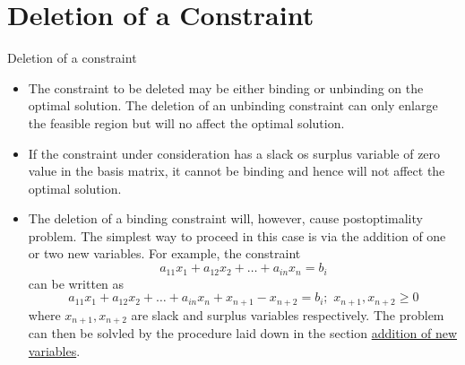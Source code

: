 
\section{Deletion of a Constraint}
\label{sec:deletion-constraint}

\begin{frame}{Deletion of a constraint}{}
  \begin{itemize} \justifying \parskip3mm
\item<only@1> The constraint to be deleted may be either binding or unbinding on the optimal solution. The deletion of an unbinding constraint can only enlarge the feasible region but will no affect the optimal solution.
\item<only@1> If the constraint under consideration has a slack os surplus variable of zero value in the basis matrix, it cannot be binding and hence will not affect the optimal solution.
\item<only@2> The deletion of a binding constraint will, however, cause postoptimality problem. The simplest way to proceed in this case is via the addition of one or two new variables. For example, the constraint \[ a_{11}x_1  + a_{12}x_2 + \ldots + a_{i n}x_n = b_{i}\] can be written as \[ a_{11}x_1  + a_{12}x_2 + \ldots + a_{i n}x_n + x_{n+1} - x_{n+2} = b_{i};\,\, x_{n+1}, x_{n+2} \geq 0\] where $x_{n+1}, x_{n+2}$ are slack and surplus variables respectively. The problem can then be solvled by the procedure laid down in the section \hyperlink{sec:addition-new-variable}{addition of new variables}.
\end{itemize}
\end{frame}


